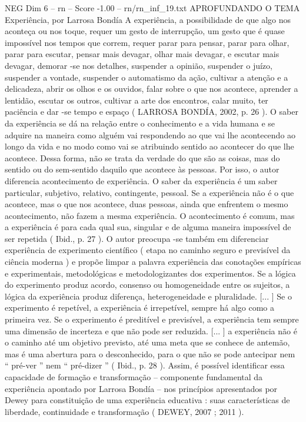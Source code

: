 \begin{textsample}{NEG Dim 6 – rn – Score -1.00 – rn/rn\_inf\_19.txt}  \label{ex:f6_neg_054}
APROFUNDANDO O TEMA Experiência, por Larrosa Bondía A experiência, a possibilidade de que algo nos aconteça ou nos toque, requer um gesto de interrupção, um gesto que é quase impossível nos tempos que correm, requer parar para pensar, parar para olhar, parar para escutar, pensar mais devagar, olhar mais devagar, e escutar mais devagar, demorar -se nos detalhes, suspender a opinião, suspender o juízo, suspender a vontade, suspender o automatismo da ação, cultivar a atenção e a delicadeza, abrir os olhos e os ouvidos, falar sobre o que nos acontece, aprender a lentidão, escutar os outros, cultivar a arte dos encontros, calar muito, ter paciência e dar -se tempo e espaço ( LARROSA BONDÍA, 2002, p. 26 ).
O saber da experiência se dá na relação entre o conhecimento e a vida humana e se adquire na maneira como alguém vai respondendo ao que vai lhe acontecendo ao longo da vida e no modo como vai se atribuindo sentido ao acontecer do que lhe acontece.
Dessa forma, não se trata da verdade do que são as coisas, mas do sentido ou do sem-sentido daquilo que acontece às pessoas.
Por isso, o autor diferencia acontecimento de experiência.
O saber da experiência é um saber particular, subjetivo, relativo, contingente, pessoal.
Se a experiência não é o que acontece, mas o que nos acontece, duas pessoas, ainda que enfrentem o mesmo acontecimento, não fazem a mesma experiência.
O acontecimento é comum, mas a experiência é para cada qual sua, singular e de alguma maneira impossível de ser repetida ( Ibid., p. 27 ).
O autor preocupa -se também em diferenciar experiência de experimento científico ( etapa no caminho seguro e previsível da ciência moderna ) e propõe limpar a palavra experiência das conotações empíricas e experimentais, metodológicas e metodologizantes dos experimentos.
Se a lógica do experimento produz acordo, consenso ou homogeneidade entre os sujeitos, a lógica da experiência produz diferença, heterogeneidade e pluralidade. [... ] Se o experimento é repetível, a experiência é irrepetível, sempre há algo como a primeira vez.
Se o experimento é preditível e previsível, a experiência tem sempre uma dimensão de incerteza e que não pode ser reduzida. [... ] a experiência não é o caminho até um objetivo previsto, até uma meta que se conhece de antemão, mas é uma abertura para o desconhecido, para o que não se pode antecipar nem “ pré-ver ” nem “ pré-dizer ” ( Ibid., p. 28 ).
Assim, é possível identificar essa capacidade de formação e transformação – componente fundamental da experiência apontado por Larrosa Bondía – nos princípios apresentados por Dewey para constituição de uma experiência educativa : suas características de liberdade, continuidade e transformação ( DEWEY, 2007 ; 2011 ).

\end{textsample}
